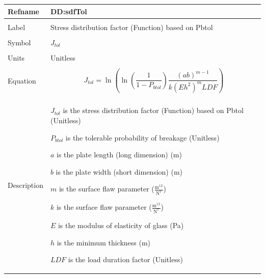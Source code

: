 \documentclass[12pt]{article}
\begin{document}
\noindent \begin{minipage}{\textwidth}
          \begin{tabular}{>{\raggedright}p{}>{\raggedright\arraybackslash}p{}}
          \toprule \textbf{Refname} & \textbf{DD:sdfTol}
          \label{DD:sdfTol}
          \\ \midrule \\
          Label & Stress distribution factor (Function) based on Pbtol
          \\ \midrule \\
          Symbol & ${J_{tol}}$
          \\ \midrule \\
          Units & Unitless
          \\ \midrule \\
          Equation & \begin{displaymath}
                     {J_{tol}}=\ln\left(\ln\left(\frac{1}{1-{P_{btol}}}\right) \frac{\left(a b\right)^{m-1}}{k \left(E h^{2}\right)^{m} LDF}\right)
                     \end{displaymath}
          \\ \midrule \\
          Description & \begin{symbDescription}
                        \item{${J_{tol}}$ is the stress distribution factor (Function) based on Pbtol (Unitless)}
                        \item{${P_{btol}}$ is the tolerable probability of breakage (Unitless)}
                        \item{$a$ is the plate length (long dimension) (m)}
                        \item{$b$ is the plate width (short dimension) (m)}
                        \item{$m$ is the surface flaw parameter ($\frac{\text{m}^{12}}{\text{N}^{7}}$)}
                        \item{$k$ is the surface flaw parameter ($\frac{\text{m}^{12}}{\text{N}^{7}}$)}
                        \item{$E$ is the modulus of elasticity of glass (Pa)}
                        \item{$h$ is the minimum thickness (m)}
                        \item{$LDF$ is the load duration factor (Unitless)}
                        \end{symbDescription}

\end{tabular}
\end{minipage}
\end{document}
